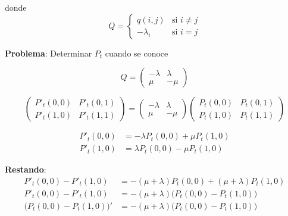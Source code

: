 \documentclass[12pt,a4paper]{article}
\begin{document}
donde
\begin{equation*}
Q = \begin{cases}
q(i,j) & \text{si } i \neq j \\
-\lambda_i & \text{si } i = j
\end{cases}
\end{equation*}


\textbf{Problema}: Determinar $P_t$ cuando se conoce

\begin{equation*}
Q = \begin{pmatrix}
-\lambda & \lambda \\
\mu & -\mu
\end{pmatrix}
\end{equation*}

\begin{center}
\end{center}

\begin{equation*}
\begin{pmatrix}
P'_t(0,0) & P'_t(0,1) \\
P'_t(1,0) & P'_t(1,1)
\end{pmatrix} = \begin{pmatrix}
-\lambda & \lambda \\
\mu & -\mu
\end{pmatrix} \begin{pmatrix}
P_t(0,0) & P_t(0,1) \\
P_t(1,0) & P_t(1,1)
\end{pmatrix}
\end{equation*}

\begin{align*}
P'_t(0,0) &= -\lambda P_t(0,0) + \mu P_t(1,0) \\
P'_t(1,0) &= \lambda P_t(0,0) - \mu P_t(1,0)
\end{align*}

\textbf{Restando}:
\begin{align*}
P'_t(0,0) - P'_t(1,0) &= -(\mu + \lambda) P_t(0,0) + (\mu + \lambda) P_t(1,0) \\
P'_t(0,0) - P'_t(1,0) &= -(\mu + \lambda) \big(P_t(0,0) - P_t(1,0)\big) \\
\big(P_t(0,0) - P_t(1,0)\big)' &= -(\mu + \lambda) \big(P_t(0,0) - P_t(1,0)\big)
\end{align*}
\end{document}
